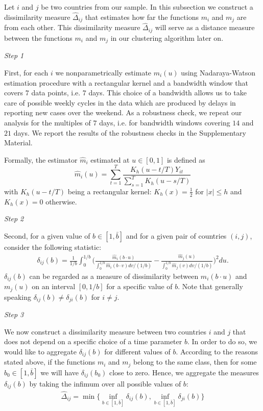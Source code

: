 \documentclass[a4paper,11pt]{article}
\numberwithin{equation}{section}
\begin{document}
Let $i$ and $j$ be two countries from our sample. In this subsection we construct a dissimilarity measure $\widehat{\Delta}_{ij}$ that estimates how far the functions $m_i$ and $m_j$ are from each other. This dissimilarity measure $\widehat{\Delta}_{ij}$ will serve as a distance measure between the functions $m_i$ and $m_j$ in our clustering algorithm later on.

\textit{Step 1}

First, for each $i$ we nonparametrically estimate $m_i(u)$ using Nadaraya-Watson estimation procedure with a rectangular kernel and a bandwidth window that covers $7$ data points, i.e. $7$ days. This choice of a bandwidth allows us to take care of possible weekly cycles in the data which are produced by delays in reporting new cases over the weekend. As a robustness check, we repeat our analysis for the multiples of $7$ days, i.e. for bandwidth windows covering $14$ and $21$ days. We report the results of the robustness checks in the Supplementary Material.

Formally, the estimator $\hat{m}_i$ estimated at $u\in [0, 1]$ is defined as
$$\hat{m}_i(u) = \sum_{t=1}^T \frac{K_h(u - t/T) Y_{it}}{\sum_{s=1}^T K_h(u - s/T)}$$
with $K_h(u - t/T)$ being a rectangular kernel: $K_h(x) = \frac{1}{2}$ for $|x| \leq h$ and $K_h(x) = 0$ otherwise.

\textit{Step 2}

Second, for a given value of $b \in [1, \bar{b}]$ and for a given pair of countries $(i, j)$, consider the following statistic:
\begin{align*}
	\delta_{ij}(b) = \frac{1}{1/b} \int_0^{1/b} \bigg( \frac{\hat{m}_i (b\cdot u)}{\int_0^{1/b} \hat{m}_i(b\cdot v) dv /(1/b)}  - \frac{\hat{m}_j (u)}{\int_0^{1/b} \hat{m}_j(v) dv /(1/b)}  \bigg)^2 du.
\end{align*}
$\delta_{ij}(b)$ can be regarded as a measure of dissimilarity between $m_i(b \cdot u)$ and $m_j(u)$ on an interval $[0, 1/b]$ for a specific value of $b$. Note that generally speaking $\delta_{ij}(b) \neq \delta_{ji}(b)$ for $i \neq j$.

\textit{Step 3}

We now construct a dissimilarity measure between two countries $i$ and $j$ that does not depend on a specific choice of a time parameter $b$. In order to do so, we would like to aggregate $\delta_{ij}(b)$ for different values of $b$. According to the reasons stated above, if the functions $m_i$ and $m_j$ belong to the same class, then for some $b_0\in [1, \bar{b}]$ we will have $\delta_{ij}(b_0)$ close to zero. Hence, we aggregate the measures $\delta_{ij} (b)$ by taking the infimum over all possible values of $b$:
\begin{align*}
	\widehat{\Delta}_{ij} = \min \{ \inf_{b\in [1, \bar{b}]} \delta_{ij}(b), \inf_{b\in [1, \bar{b}]} \delta_{ji}(b) \}
\end{align*}
\end{document}
